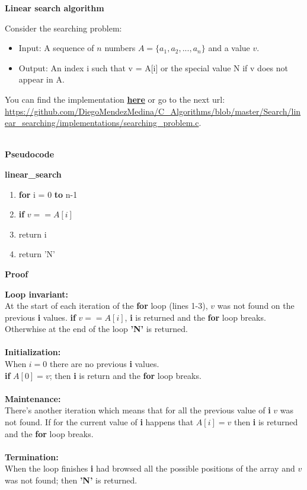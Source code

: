 \documentclass[12pt, twoside, a4paper]{article}
\begin{document}
\begin{center}
  {\large \bfseries Linear search algorithm \par}
\end{center}
Consider the searching problem:  \\
\begin{itemize}
\item Input: A sequence of $n$ numbers $A = \{a_1, a_2, ..., a_n\}$ and a value $v$.
\item Output: An index i such that v = A[i] or the special value N if v does not appear in A.
\end{itemize}
You can find the implementation \href{https://github.com/DiegoMendezMedina/C_Algorithms/blob/master/Search/linear_searching/implementations/searching_problem.c}{\textbf{here}} or go to the next url: \url{https://github.com/DiegoMendezMedina/C_Algorithms/blob/master/Search/linear_searching/implementations/searching_problem.c}. \\ \\
  \begin{center}
    {\large \textbf{Pseudocode} \par}
  \end{center}
  \textbf{linear\_search}
  \begin{enumerate}
  \item \textbf{for} i = 0 \textbf{to} n-1
  \item \hspace{.5cm} \textbf{if} $v == A[i]$
  \item \hspace{1cm} return i
  \item  return 'N' \\
  \end{enumerate}
  \begin{center}
    {\large \textbf{Proof} \par}
  \end{center}
  \textbf{Loop invariant:}\\ At the start of each iteration of the \textbf{for} loop (lines 1-3), $v$ was not found on the previous \textbf{i} values.  \textbf{if} $v == A[i]$, \textbf{i} is returned and the \textbf{for} loop breaks.
  Otherwhise at the end of the loop \textbf{'N'} is returned. \\ \\
  \textbf{Initialization:} \\
  When $i = 0$ there are no previous \textbf{i} values.\\ \textbf{if} $A[0] = v$; then \textbf{i} is return and the \textbf{for} loop breaks.\\ \\
  \textbf{Maintenance:} \\
  There's another iteration which means that for all the previous value of \textbf{i} $v$ was not found. If for the current value of \textbf{i} happens that $A[i] = v$ then \textbf{i} is returned and the \textbf{for} loop breaks.\\ \\
  \textbf{Termination:}\\
  When the loop finishes \textbf{i} had browsed all the possible positions of the array and $v$ was not found; then \textbf{'N'} is returned.
\end{document}
